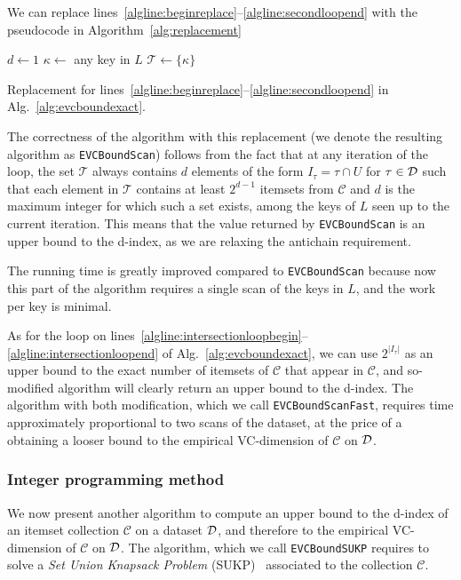 We can replace lines~\ref{algline:beginreplace}--\ref{algline:secondloopend}
with the pseudocode in Algorithm~\ref{alg:replacement}
\begin{algorithm}[h!]
	\DontPrintSemicolon
	$d\leftarrow 1$\;
	$\kappa\leftarrow$ any key in $L$\;
	$\mathcal{T}\leftarrow\{\kappa\}$\;
	\;
	\caption{Replacement for
		lines~\ref{algline:beginreplace}--\ref{algline:secondloopend} in
		Alg.~\ref{alg:evcboundexact}.}
	\label{alg:replacement}
\end{algorithm}
The correctness of the algorithm with this replacement (we denote the resulting
algorithm as \texttt{EVCBoundScan}) follows from the fact that at any iteration
of the loop, the set $\mathcal{T}$ always contains $d$ elements of the form
$I_\tau=\tau\cap U$ for $\tau\in{\cal D}$ such that each element in $\mathcal{T}$
contains at least $2^{d-1}$ itemsets from $\mathcal{C}$ and $d$ is the maximum
integer for which such a set exists, among the keys of $L$ seen up to the
current iteration. This means that the value returned by \texttt{EVCBoundScan}
is an upper bound to the d-index, as we are relaxing the antichain requirement.

The running time is greatly improved compared to \texttt{EVCBoundScan} because
now this part of the algorithm requires a single scan of the keys in $L$, and
the work per key is minimal.

As for the loop on
lines~\ref{algline:intersectionloopbegin}--\ref{algline:intersectionloopend} of
Alg.~\ref{alg:evcboundexact}, we can use $2^{|I_\tau|}$ as an upper bound to the
exact number of itemsets of $\mathcal{C}$ that appear in $\mathcal{C}$, and
so-modified algorithm will clearly return an upper bound to the d-index. The
algorithm with both modification, which we call \texttt{EVCBoundScanFast},
requires time approximately proportional to two scans of the dataset, at the
price of a obtaining a looser bound to the empirical VC-dimension of
$\mathcal{C}$ on ${\cal D}$.

\subsubsection{Integer programming method}
We now present another algorithm to compute an upper bound to the d-index of an
itemset collection $\mathcal{C}$ on a dataset ${\cal D}$, and therefore to the
empirical VC-dimension of $\mathcal{C}$ on ${\cal D}$. The algorithm, which we call
\texttt{EVCBoundSUKP} requires to solve a \emph{Set Union Knapsack Problem}
(SUKP)~\citep{GoldschmidtNY94} associated to the collection $\mathcal{C}$.

